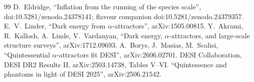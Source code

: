 \documentclass[aps,prd,twocolumn,superscriptaddress,nofootinbib,showkeys]{revtex4-2}
\begin{document}
\begin{thebibliography}{99}
 D.~Eldridge, ``Inflation from the running of the species scale'', doi:10.5281/zenodo.24378141; flavour companion doi:10.5281/zenodo.24379357.
 E.~V.~Linder, ``Dark energy from $\alpha$-attractors'', arXiv:1505.00815.
 Y.~Akrami, R.~Kallosh, A.~Linde, V.~Vardanyan, ``Dark energy, $\alpha$-attractors, and large-scale structure surveys'', arXiv:1712.09693.
 A.~Borys, J.~Masias, M.~Scalisi, ``Quintessential $\alpha$-attractors fit DESI'', arXiv:2606.02701.
 DESI Collaboration, DESI DR2 Results II, arXiv:2503.14738, Tables V--VI.
 ``Quintessence and phantoms in light of DESI 2025'', arXiv:2506.21542.
\end{thebibliography}
\end{document}
